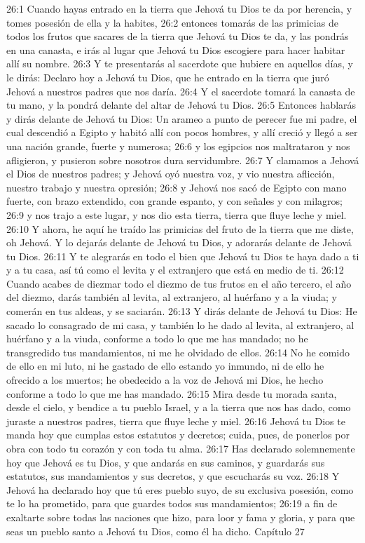 26:1 Cuando hayas entrado en la tierra que Jehová tu Dios te da por herencia, y tomes posesión de ella y la habites,  
26:2 entonces tomarás de las primicias de todos los frutos que sacares de la tierra que Jehová tu Dios te da, y las pondrás en una canasta, e irás al lugar que Jehová tu Dios escogiere para hacer habitar allí su nombre.  
26:3 Y te presentarás al sacerdote que hubiere en aquellos días, y le dirás: Declaro hoy a Jehová tu Dios, que he entrado en la tierra que juró Jehová a nuestros padres que nos daría.  
26:4 Y el sacerdote tomará la canasta de tu mano, y la pondrá delante del altar de Jehová tu Dios.  
26:5 Entonces hablarás y dirás delante de Jehová tu Dios: Un arameo a punto de perecer fue mi padre, el cual descendió a Egipto y habitó allí con pocos hombres, y allí creció y llegó a ser una nación grande, fuerte y numerosa;  
26:6 y los egipcios nos maltrataron y nos afligieron, y pusieron sobre nosotros dura servidumbre.  
26:7 Y clamamos a Jehová el Dios de nuestros padres; y Jehová oyó nuestra voz, y vio nuestra aflicción, nuestro trabajo y nuestra opresión;  
26:8 y Jehová nos sacó de Egipto con mano fuerte, con brazo extendido, con grande espanto, y con señales y con milagros;  
26:9 y nos trajo a este lugar, y nos dio esta tierra, tierra que fluye leche y miel.  
26:10 Y ahora, he aquí he traído las primicias del fruto de la tierra que me diste, oh Jehová. Y lo dejarás delante de Jehová tu Dios, y adorarás delante de Jehová tu Dios.  
26:11 Y te alegrarás en todo el bien que Jehová tu Dios te haya dado a ti y a tu casa, así tú como el levita y el extranjero que está en medio de ti.  
26:12 Cuando acabes de diezmar todo el diezmo de tus frutos en el año tercero, el año del diezmo, darás también al levita, al extranjero, al huérfano y a la viuda; y comerán en tus aldeas, y se saciarán. 
26:13 Y dirás delante de Jehová tu Dios: He sacado lo consagrado de mi casa, y también lo he dado al levita, al extranjero, al huérfano y a la viuda, conforme a todo lo que me has mandado; no he transgredido tus mandamientos, ni me he olvidado de ellos.  
26:14 No he comido de ello en mi luto, ni he gastado de ello estando yo inmundo, ni de ello he ofrecido a los muertos; he obedecido a la voz de Jehová mi Dios, he hecho conforme a todo lo que me has mandado.  
26:15 Mira desde tu morada santa, desde el cielo, y bendice a tu pueblo Israel, y a la tierra que nos has dado, como juraste a nuestros padres, tierra que fluye leche y miel.  
26:16 Jehová tu Dios te manda hoy que cumplas estos estatutos y decretos; cuida, pues, de ponerlos por obra con todo tu corazón y con toda tu alma.  
26:17 Has declarado solemnemente hoy que Jehová es tu Dios, y que andarás en sus caminos, y guardarás sus estatutos, sus mandamientos y sus decretos, y que escucharás su voz.  
26:18 Y Jehová ha declarado hoy que tú eres pueblo suyo, de su exclusiva posesión, como te lo ha prometido, para que guardes todos sus mandamientos;  
26:19 a fin de exaltarte sobre todas las naciones que hizo, para loor y fama y gloria, y para que seas un pueblo santo a Jehová tu Dios, como él ha dicho.  
Capítulo 27

